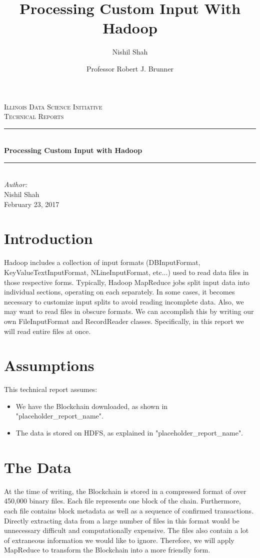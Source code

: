 \documentclass[9pt,twocolumn,twoside]{idsi}
\author[1,3]{Nishil Shah}
\author[2,3]{Professor Robert J. Brunner}
\affil[1]{National Center For Supercomputing Applications (NCSA)}
\affil[2]{Laboratory for Computation, Data, and Machine Learning}
\affil[3]{Illinois Data Science Initiative}
\title{Processing Custom Input With Hadoop}
\newcommand{\HRule}{\rule{\linewidth}{0.5mm}}
\begin{document}
\begin{titlepage}
\center
\textsc{\LARGE Illinois Data Science Initiative}\\[1.5cm]
\textsc{\Large Technical Reports}\\[0.5cm] \HRule \\[0.4cm]
{\huge \bfseries Processing Custom Input with Hadoop } \\[0.4cm] \HRule \\[1.5cm]
\Large \emph{Author:}\\ Nishil Shah \\[3cm]
{\large February 23, 2017}\\[3cm] %
\vfill
\end{titlepage}
%

\maketitle

\section{Introduction}
Hadoop includes a collection of input formats (DBInputFormat, KeyValueTextInputFormat, NLineInputFormat, etc...) used to read data files in those respective forms. Typically, Hadoop MapReduce jobs split input data into individual sections, operating on each separately. In some cases, it becomes necessary to customize input splits to avoid reading incomplete data. Also, we may want to read files in obscure formats. We can accomplish this by writing our own FileInputFormat and RecordReader classes. Specifically, in this report we will read entire files at once.

\section{Assumptions}
This technical report assumes:
\begin{itemize}
    \item We have the Blockchain downloaded, as shown in "placeholder\_report\_name".
    \item The data is stored on HDFS, as explained in "placeholder\_report\_name".
\end{itemize}

\section{The Data}
At the time of writing, the Blockchain is stored in a compressed format of over 450,000 binary files. Each file represents one block of the chain. Furthermore, each file contains block metadata as well as a sequence of confirmed transactions. Directly extracting data from a large number of files in this format would be unnecessary difficult and computationally expensive. The files also contain a lot of extraneous information we would like to ignore. Therefore, we will apply MapReduce to transform the Blockchain into a more friendly form.
\end{document}
